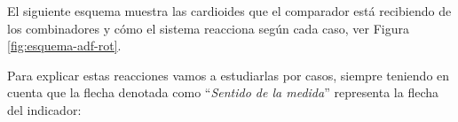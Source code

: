 \begin{figure}[!h]
  \centering
{}
  \caption{}
\end{figure}


El siguiente esquema muestra las cardioides que el comparador est\'a recibiendo de los combinadores y c\'omo el sistema reacciona seg\'un cada caso, ver Figura \ref{fig:esquema-adf-rot}.


Para explicar estas reacciones vamos a estudiarlas por casos, siempre teniendo en cuenta que la flecha denotada como ``\emph{Sentido de la medida}'' representa la flecha del indicador:

